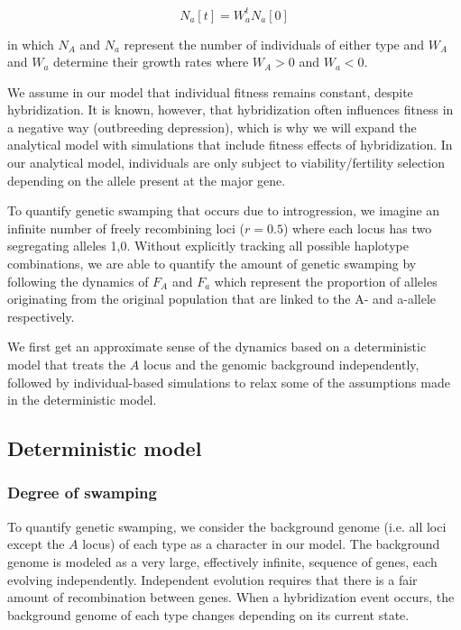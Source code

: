 \documentclass[a4paper,10pt]{article}
\begin{document}
    \begin{equation}
	N_a[t] = W_a^t N_a[0] 
	\label{Eq N}
	\end{equation}
    
 in which $N_A$ and $N_a$ represent the number of individuals of either type and $W_A$ and $W_a$ determine their growth rates where $W_A>0$ and $W_a<0$.
 
    We assume in our model that individual fitness remains constant, despite hybridization. It is known, however, that hybridization often influences fitness in a negative way (outbreeding depression), which is why we will expand the analytical model with simulations that include fitness effects of hybridization. In our analytical model, individuals are only subject to viability/fertility selection depending on the allele present at the major gene.
    
    To quantify genetic swamping that occurs due to introgression, we imagine an infinite number of freely recombining loci ($r=0.5$) where each locus has two segregating alleles {1,0}. Without explicitly tracking all possible haplotype combinations, we are able to quantify the amount of genetic swamping by following the dynamics of $F_A$ and $F_a$ which represent the proportion of alleles originating from the original population that are linked to the A- and a-allele respectively.   
    
    We first get an approximate sense of the dynamics based on a deterministic model that treats the $A$ locus and the genomic background independently, followed by individual-based simulations to relax some of the assumptions made in the deterministic model.
	
	\subsection*{Deterministic model}
	\subsubsection*{Degree of swamping}
	To quantify genetic swamping, we consider the background genome (i.e. all loci except the $A$ locus) of each type as a character in our model. The background genome is modeled as a very large, effectively infinite, sequence of genes, each evolving independently. Independent evolution requires that there is a fair amount of recombination between genes. When a hybridization event occurs, the background genome of each type changes depending on its current state.
	
\end{document}
